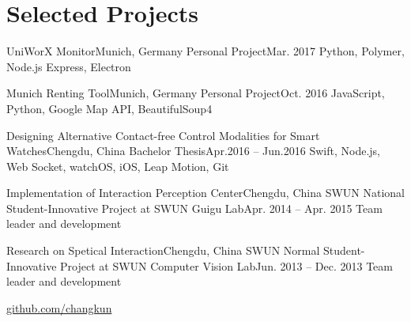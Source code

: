\section{\textbf{Selected Projects}}
  \resumeSubHeadingListStart
    \resumeSubheading
      {UniWorX Monitor}{Munich, Germany}
      {Personal Project}{Mar. 2017}
      \resumeItemListStart
          {Python, Polymer, Node.js Express, Electron}
      \resumeItemListEnd

    \resumeSubheading
      {Munich Renting Tool}{Munich, Germany}
      {Personal Project}{Oct. 2016}
      \resumeItemListStart
          {JavaScript, Python, Google Map API, BeautifulSoup4}
      \resumeItemListEnd

    \resumeSubheading
      {Designing Alternative Contact-free Control Modalities for Smart Watches}{Chengdu, China}
      {Bachelor Thesis}{Apr.2016 -- Jun.2016}
      \resumeItemListStart
          {Swift, Node.js, Web Socket, watchOS, iOS, Leap Motion, Git}
      \resumeItemListEnd

    \resumeSubheading
      {Implementation of Interaction Perception Center}{Chengdu, China}
      {SWUN National Student-Innovative Project at SWUN Guigu Lab}{Apr. 2014 -- Apr. 2015}
      \resumeItemListStart
          {Team leader and development}
      \resumeItemListEnd

    \resumeSubheading
      {Research on Spetical Interaction}{Chengdu, China}
      {SWUN Normal Student-Innovative Project at SWUN Computer Vision Lab}{Jun. 2013 -- Dec. 2013}
      \resumeItemListStart
          {Team leader and development}
      \resumeItemListEnd

      {\href{https://github.com/changkun/}{github.com/changkun}}

  \resumeSubHeadingListEnd